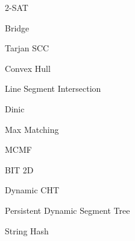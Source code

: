 \documentclass{article}
\newcommand{\mytitle}[1]{
    \begin{center}
        {\LARGE #1} \\[0.5cm]
    \end{center}
}
\begin{document}
\mytitle{2-SAT}



\pagebreak

\mytitle{Bridge}



\pagebreak

\mytitle{Tarjan SCC}



\pagebreak

\mytitle{Convex Hull}



\pagebreak

\mytitle{Line Segment Intersection}



\pagebreak

\mytitle{Dinic}



\pagebreak

\mytitle{Max Matching}



\pagebreak

\mytitle{MCMF}



\pagebreak

\mytitle{BIT 2D}



\pagebreak

\mytitle{Dynamic CHT}



\pagebreak

\mytitle{Persistent Dynamic Segment Tree}



\pagebreak

\mytitle{String Hash}



\pagebreak
\end{document}
